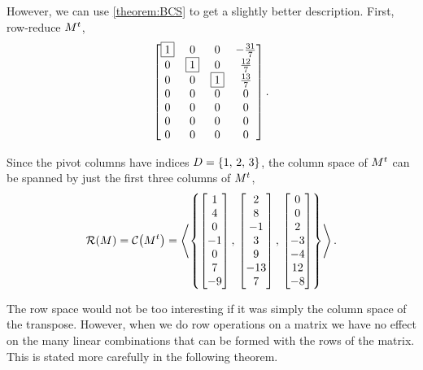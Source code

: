 \documentclass{ximera}
\begin{document}
\begin{example}
  However, we can use \ref{theorem:BCS} to get a slightly better description.  First, row-reduce $M^{t}$,
  \[
    \begin{bmatrix}
      \fbox{1} & 0 & 0 & -\frac{31}{7}\\
      0 & \fbox{1} & 0 & \frac{12}{7}\\
      0 & 0 & \fbox{1} & \frac{13}{7}\\
      0 & 0 & 0 & 0\\
      0 & 0 & 0 & 0\\
      0 & 0 & 0 & 0\\
      0 & 0 & 0 & 0
    \end{bmatrix}.
  \]

  Since the pivot columns have indices $D=\left\{1,\,2,\,3\right\}$, the column
  space of $M^{t}$ can be spanned by just the first three
  columns of $M^{t}$,
  \[
    \mathcal{R}\!\left(M\right)=\mathcal{C}\!\left(M^{t}\right)=
    \left\langle\left\{
        \begin{bmatrix}1\\4\\0\\-1\\0\\7\\-9\end{bmatrix},\,
        \begin{bmatrix}2\\8\\-1\\3\\9\\-13\\7\end{bmatrix},\,
        \begin{bmatrix}0\\0\\2\\-3\\-4\\12\\-8\end{bmatrix}
      \right\}\right\rangle.
  \]
\end{example}

The row space would not be too interesting if it was simply the column
space of the transpose.  However, when we do row operations on a
matrix we have no effect on the many linear combinations that can be
formed with the rows of the matrix.  This is stated more carefully in
the following theorem.
\end{document}
